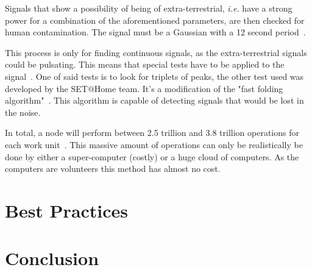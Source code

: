Signals that show a possibility of being of extra-terrestrial, \textit{i.e.} 
have a strong power for a combination of the aforementioned parameters, are then 
 checked for human contamination. The signal must be 
a Gaussian with a 12 second period~\cite{hid-sp18-601-paper-anderson2002seti}.

This process is only for finding continuous signals, as the extra-terrestrial 
signals could be pulsating. This means that special tests have to be applied 
to the signal~\cite{hid-sp18-601-www-sathome-howworks}. One of said tests is 
to look for triplets of peaks, the other test
used was developed by the SET$@$Home team. It's a modification of the 
"fast folding algorithm"~\cite{hid-sp18-601-paper-korpela2001seti}.
This algorithm is capable of detecting signals that would be lost in the noise.

In total, a node will perform between 2.5 trillion and 3.8 trillion operations 
for each work unit~\cite{hid-sp18-601-www-sathome-howworks}. 
This massive amount of operations can only be realistically 
be done by either a super-computer (costly) or a huge cloud of computers. As the
 computers are volunteers this method has almost no cost.
\section{Best Practices}


\section{Conclusion}

\begin{acks}

\end{acks}


 

